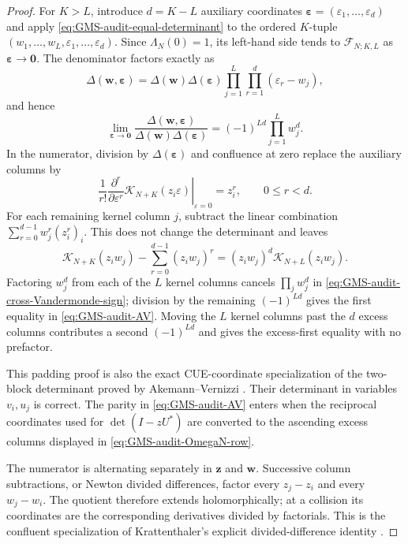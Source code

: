 \begin{proof}
For $K>L$, introduce $d=K-L$ auxiliary coordinates
$\boldsymbol\varepsilon=(\varepsilon_1,\ldots,\varepsilon_d)$ and apply
\eqref{eq:GMS-audit-equal-determinant} to the ordered $K$-tuple
$(w_1,\ldots,w_L,\varepsilon_1,\ldots,\varepsilon_d)$.  Since
$\Lambda_N(0)=1$, its left-hand side tends to $\mathcal F_{N;K,L}$ as
$\boldsymbol\varepsilon\to\boldsymbol0$.  The denominator factors exactly as
\begin{equation}
 \Delta(\mathbf w,\boldsymbol\varepsilon)
 =\Delta(\mathbf w)\Delta(\boldsymbol\varepsilon)
  \prod_{j=1}^{L}\prod_{r=1}^{d}(\varepsilon_r-w_j),
 \label{eq:GMS-audit-padded-Vandermonde}
\end{equation}
and hence
\begin{equation}
 \lim_{\boldsymbol\varepsilon\to\boldsymbol0}
 \frac{\Delta(\mathbf w,\boldsymbol\varepsilon)}
 {\Delta(\mathbf w)\Delta(\boldsymbol\varepsilon)}
 =(-1)^{Ld}\prod_{j=1}^{L}w_j^d.
 \label{eq:GMS-audit-cross-Vandermonde-sign}
\end{equation}
In the numerator, division by $\Delta(\boldsymbol\varepsilon)$ and confluence at zero replace
the auxiliary columns by
\begin{equation}
 \left.
 \frac1{r!}\frac{\partial^r}{\partial\varepsilon^r}
 \mathcal K_{N+K}(z_i\varepsilon)
 \right|_{\varepsilon=0}=z_i^r,
 \qquad 0\leq r<d.
 \label{eq:GMS-audit-zero-jet-columns}
\end{equation}
For each remaining kernel column $j$, subtract the linear combination
$\sum_{r=0}^{d-1}w_j^r(z_i^r)_i$.  This does not change the determinant and leaves
\begin{equation}
 \mathcal K_{N+K}(z_iw_j)-\sum_{r=0}^{d-1}(z_iw_j)^r
 =(z_iw_j)^d\mathcal K_{N+L}(z_iw_j).
 \label{eq:GMS-audit-kernel-tail-removal}
\end{equation}
Factoring $w_j^d$ from each of the $L$ kernel columns cancels
$\prod_jw_j^d$ in \eqref{eq:GMS-audit-cross-Vandermonde-sign}; division by the remaining
$(-1)^{Ld}$ gives the first equality in \eqref{eq:GMS-audit-AV}.  Moving the $L$ kernel
columns past the $d$ excess columns contributes a second $(-1)^{Ld}$ and gives the
excess-first equality with no prefactor.

This padding proof is also the exact CUE-coordinate specialization of the two-block
determinant proved by Akemann--Vernizzi
\cite[pp.~8--12, especially the induction displayed in eq.~(2.12)]{akemannVernizzi2003}.
Their determinant in variables $v_i,u_j$ is correct.  The parity in
\eqref{eq:GMS-audit-AV} enters when the reciprocal coordinates used for
$\det(I-zU^*)$ are converted to the ascending excess columns displayed in
\eqref{eq:GMS-audit-OmegaN-row}.

The numerator is alternating separately in $\mathbf z$ and $\mathbf w$.  Successive column
subtractions, or Newton divided differences, factor every $z_j-z_i$ and every $w_j-w_i$.
The quotient therefore extends holomorphically; at a collision its coordinates are the
corresponding derivatives divided by factorials.  This is the confluent specialization of
Krattenthaler's explicit divided-difference identity
\cite[Lemma~22]{krattenthaler1999}.
\end{proof}

